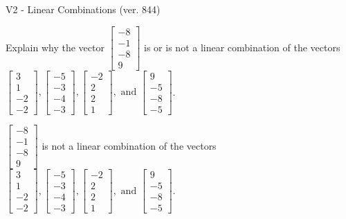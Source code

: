 \begin{exercise}
  \begin{exerciseTitle}V2 - Linear Combinations (ver. 844)\end{exerciseTitle}
  \begin{exerciseStatement}
    Explain why the vector \(\left[\begin{array}{c}
-8 \\
-1 \\
-8 \\
9
\end{array}\right]\)  is or is not a linear 
	combination of the vectors \(\left[\begin{array}{c}
3 \\
1 \\
-2 \\
-2
\end{array}\right] , \left[\begin{array}{c}
-5 \\
-3 \\
-4 \\
-3
\end{array}\right] , \left[\begin{array}{c}
-2 \\
2 \\
2 \\
1
\end{array}\right] , \text{ and } \left[\begin{array}{c}
9 \\
-5 \\
-8 \\
-5
\end{array}\right]\).
	


  \end{exerciseStatement}
  \begin{exerciseAnswer}
   \(\left[\begin{array}{c}
-8 \\
-1 \\
-8 \\
9
\end{array}\right]\) 
  	 is not  
	a linear combination of the vectors \(\left[\begin{array}{c}
3 \\
1 \\
-2 \\
-2
\end{array}\right] , \left[\begin{array}{c}
-5 \\
-3 \\
-4 \\
-3
\end{array}\right] , \left[\begin{array}{c}
-2 \\
2 \\
2 \\
1
\end{array}\right] , \text{ and } \left[\begin{array}{c}
9 \\
-5 \\
-8 \\
-5
\end{array}\right]\).


\end{exerciseAnswer}
\end{exercise}
